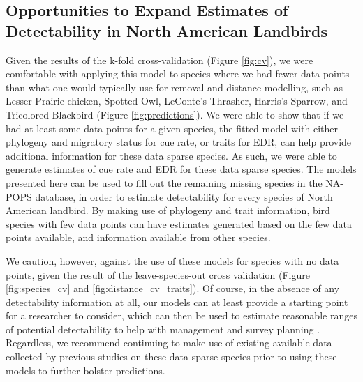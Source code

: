 \documentclass[12pt]{article}
\begin{document}
\subsection{Opportunities to Expand Estimates of Detectability in North American Landbirds}

\par Given the results of the k-fold cross-validation (Figure \ref{fig:cv}), we were comfortable with applying this model to species where we had fewer data points than what one would typically use for removal and distance modelling, such as Lesser Prairie-chicken, Spotted Owl, LeConte's Thrasher, Harris's Sparrow, and Tricolored Blackbird (Figure \ref{fig:predictions}).
We were able to show that if we had at least some data points for a given species, the fitted model with either phylogeny and migratory status for cue rate, or traits for EDR, can help provide additional information for these data sparse species.
As such, we were able to generate estimates of cue rate and EDR for these data sparse species.
The models presented here can be used to fill out the remaining missing species in the NA-POPS database, in order to estimate detectability for every species of North American landbird. 
By making use of phylogeny and trait information, bird species with few data points can have estimates generated based on the few data points available, and information available from other species.

\par We caution, however, against the use of these models for species with no data points, given the result of the leave-species-out cross validation (Figure \ref{fig:species_cv} and \ref{fig:distance_cv_traits}).
Of course, in the absence of any detectability information at all, our models can at least provide a starting point for a researcher to consider, which can then be used to estimate reasonable ranges of potential detectability to help with management and survey planning \citep{bennett_how_2024}.
Regardless, we recommend continuing to make use of existing available data collected by previous studies on these data-sparse species prior to using these models to further bolster predictions.
\end{document}
